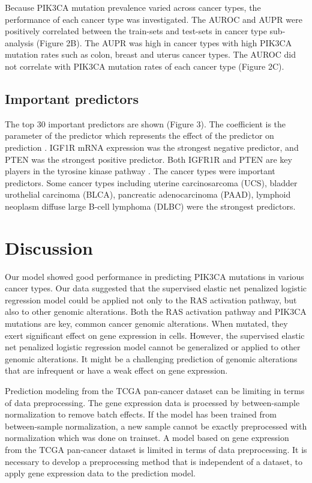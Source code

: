 \documentclass[10pt,letterpaper]{article}
\begin{document}
Because PIK3CA mutation prevalence varied across cancer types, the
performance of each cancer type was investigated. The AUROC and AUPR
were positively correlated between the train-sets and test-sets in
cancer type sub-analysis (Figure 2B). The AUPR was high in cancer types
with high PIK3CA mutation rates such as colon, breast and uterus cancer
types. The AUROC did not correlate with PIK3CA mutation rates of each
cancer type (Figure 2C).

\hypertarget{important-predictors}{%
\subsection{Important predictors}\label{important-predictors}}

The top 30 important predictors are shown (Figure 3). The coefficient is
the parameter of the predictor which represents the effect of the
predictor on prediction . IGF1R mRNA expression was the strongest
negative predictor, and PTEN was the strongest positive predictor. Both
IGFR1R and PTEN are key players in the tyrosine kinase pathway . The
cancer types were important predictors. Some cancer types including
uterine carcinosarcoma (UCS), bladder urothelial carcinoma (BLCA),
pancreatic adenocarcinoma (PAAD), lymphoid neoplasm diffuse large B-cell
lymphoma (DLBC) were the strongest predictors.

\hypertarget{discussion}{%
\section{Discussion}\label{discussion}}

Our model showed good performance in predicting PIK3CA mutations in
various cancer types. Our data suggested that the supervised elastic net
penalized logistic regression model could be applied not only to the RAS
activation pathway, but also to other genomic alterations. Both the RAS
activation pathway and PIK3CA mutations are key, common cancer genomic
alterations. When mutated, they exert significant effect on gene
expression in cells. However, the supervised elastic net penalized
logistic regression model cannot be generalized or applied to other
genomic alterations. It might be a challenging prediction of genomic
alterations that are infrequent or have a weak effect on gene
expression.

Prediction modeling from the TCGA pan-cancer dataset can be limiting in
terms of data preprocessing. The gene expression data is processed by
between-sample normalization to remove batch effects. If the model has
been trained from between-sample normalization, a new sample cannot be
exactly preprocessed with normalization which was done on trainset. A
model based on gene expression from the TCGA pan-cancer dataset is
limited in terms of data preprocessing. It is necessary to develop a
preprocessing method that is independent of a dataset, to apply gene
expression data to the prediction model.
\end{document}
